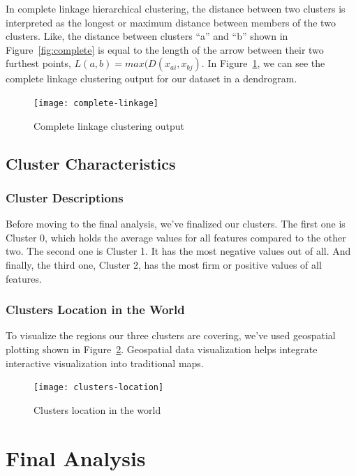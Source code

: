 \documentclass{swfuthesise}
\begin{document}
In complete linkage hierarchical clustering, the distance between two clusters is interpreted as the longest or maximum distance between members of the two clusters.  
Like, the distance between clusters ``a'' and ``b'' shown in Figure~\ref{fig:complete} is
equal to the length of the arrow between their two furthest points,
\(L(a,b) = max(D(x_{ai},x_{bj})\). In Figure~\ref{fig:complete-linkage}, we can see the complete linkage clustering output for our dataset in a dendrogram. 

\begin{figure}[htp]
  \centering \texttt{[image: complete-linkage]}
  \caption{Complete linkage clustering output}
  \label{fig:complete-linkage}
\end{figure}

\subsection{Cluster Characteristics}

\subsubsection{Cluster Descriptions}

Before moving to the final analysis, we've finalized our clusters. The first one is Cluster 0, which holds the average values for all features compared to the other two. The second one is Cluster 1. It has the most negative values out of all. And finally, the third one, Cluster 2, has the most firm or positive values of all features.

\subsubsection{Clusters Location in the World}

To visualize the regions our three clusters are covering, we've used geospatial plotting shown in Figure~\ref{fig:location}. Geospatial data visualization helps integrate interactive visualization into traditional maps.

\begin{figure}[htp]
    \centering
    \texttt{[image: clusters-location]}
    \caption{Clusters location in the world}
    \label{fig:location}
\end{figure}

\section{Final Analysis}
\end{document}
